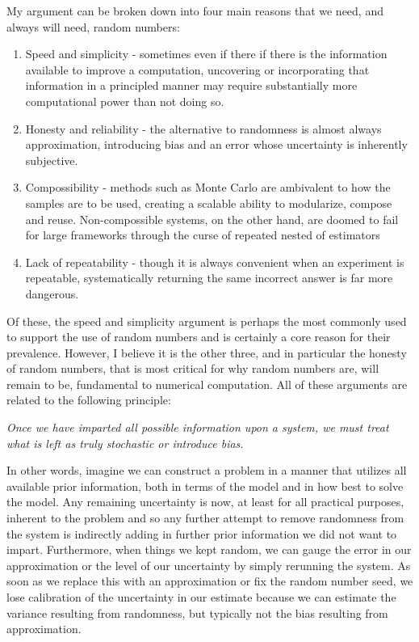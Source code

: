 My argument can be broken down into four main reasons that we need, and always will need, random numbers:
\begin{enumerate}
	\item Speed and simplicity - sometimes even if there if there is the information available to improve a computation, 
	uncovering or incorporating that information in a principled manner may require substantially more computational 
	power than not doing so.
	\item Honesty and reliability - the alternative to randomness is almost always approximation, introducing bias 
	and an error whose uncertainty is inherently subjective.
	\item Compossibility - methods such as Monte Carlo are ambivalent to how the samples are to be used, creating 
	a scalable ability to modularize, compose and reuse.  Non-compossible systems, on the other hand, are doomed to fail
	for large frameworks through the curse of repeated nested of estimators~\citep{rainforth2017pitfalls}
	\item Lack of repeatability - though it is always convenient when an experiment is repeatable, systematically 
	returning the same incorrect answer is far more dangerous.
\end{enumerate}
Of these, the speed and simplicity argument is perhaps the most commonly used to support the use of random 
numbers and is certainly a core reason for their prevalence.  However, I believe it is the other three, and in 
particular the honesty of random numbers, that is most critical for why random numbers are, will remain to be, 
fundamental to numerical computation.  All of these arguments are related to the following principle:

\emph{Once we have imparted all possible information upon a system, we must treat what is left as truly 
	stochastic or introduce bias.}

In other words, imagine we can construct a problem in a manner that utilizes all available prior information,
both in terms of the model and in how best to solve the model.
Any remaining uncertainty is now, at least for all practical purposes, inherent to the problem and so any
further attempt to remove randomness from the system is indirectly adding in further prior information we
did not want to impart.  Furthermore, when things we kept random, we can gauge the error in our approximation
or the level of our uncertainty by simply rerunning the system.  As soon as we replace this with an approximation
or fix the random number seed, we lose calibration of the uncertainty in our estimate because we can estimate the variance
resulting from randomness, but typically not the bias resulting from approximation.

